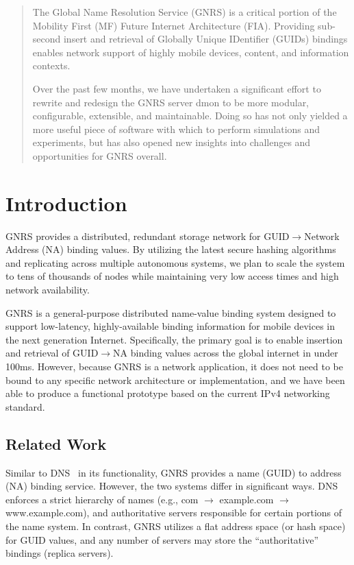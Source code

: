 \documentclass[conference, 11pt]{IEEEtran}
\begin{document}
\maketitle
\begin{abstract}
The Global Name Resolution Service (GNRS) is a critical portion of the
Mobility First (MF) Future Internet Architecture (FIA). Providing sub-second
insert and retrieval of Globally Unique IDentifier (GUIDs) bindings enables
network support of highly mobile devices, content, and information contexts.

Over the past few months, we have undertaken a significant effort to rewrite
and redesign the GNRS server dmon to be more modular, configurable,
extensible, and maintainable.  Doing so has not only yielded a more useful
piece of software with which to perform simulations and experiments, but has
also opened new insights into challenges and opportunities for GNRS overall.
\end{abstract}
\section{Introduction}
GNRS provides a distributed, redundant storage network for
GUID$\rightarrow$Network Address (NA) binding values.  By utilizing the latest
secure hashing algorithms and replicating across multiple autonomous systems,
we plan  to scale the system to tens of thousands of nodes while maintaining
very low access times and high network availability.

GNRS is a general-purpose distributed name-value binding system designed to
support low-latency, highly-available binding information for mobile devices
in the next generation Internet.  Specifically, the primary goal is to enable
insertion and retrieval of GUID$\rightarrow$NA binding values across the
global internet in under 100ms.  However, because GNRS is a network
application, it does not need to be bound to any specific network architecture
or implementation, and we have been able to produce a functional prototype
based on the current IPv4 networking standard.


\subsection{Related Work}
Similar to DNS~\cite{rfc1035} in its functionality, GNRS provides a name (GUID) to address
(NA) binding service.  However, the two systems differ in significant ways.
DNS enforces a strict hierarchy of names (e.g., com $\rightarrow$ example.com
$\rightarrow$ www.example.com), and authoritative servers responsible for
certain portions of the name system.  In contrast, GNRS utilizes a flat
address space (or hash space) for GUID values, and any number of servers may
store the ``authoritative'' bindings (replica servers).
\end{document}
